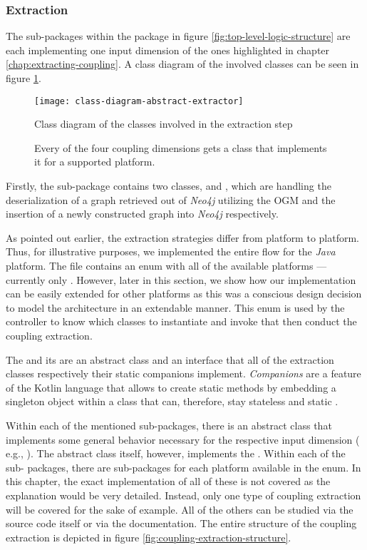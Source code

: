 \documentclass[12pt,a4paper]{report}
\begin{document}
\subsubsection{Extraction}
The sub-packages within the package 
in figure \ref{fig:top-level-logic-structure} are each
implementing one input dimension of the ones highlighted in chapter
\ref{chap:extracting-coupling}.
A class diagram of the involved classes can be seen in
figure \ref{fig:class-diagram-abstract-extractor}.

\begin{figure}[htbp]
\centering
\texttt{[image: class-diagram-abstract-extractor]}
\caption{Class diagram of the classes involved in the extraction step}
\caption*{\centering
  Every of the four coupling dimensions gets a class that implements it
  for a supported platform.
}
\label{fig:class-diagram-abstract-extractor}
\end{figure}

Firstly, the sub-package  contains two classes,  and , which are handling the
deserialization of a graph retrieved out of \textit{Neo4j} utilizing the OGM
and the insertion of a newly constructed graph into \textit{Neo4j}
respectively.

As pointed out earlier, the extraction strategies differ from platform to
platform. Thus, for illustrative purposes, we implemented the entire flow for
the \textit{Java} platform. The  file contains an enum with
all of the available platforms --- currently only . However, later
in this section, we show how our implementation can be easily extended for
other platforms as this was a conscious design decision to model the
architecture in an extendable manner. This enum is used by the controller to
know which classes to instantiate and invoke that then conduct the coupling
extraction.

The  and its  are an
abstract class and an interface that all of the extraction classes respectively
their static companions implement. \textit{Companions} are a feature of the
Kotlin language that allows to create static methods by embedding a singleton
object within a class that can, therefore, stay stateless and static
\cite{kotlin-companions}.

Within each of the mentioned sub-packages, there is an abstract class that
implements some general behavior necessary for the respective input dimension (
e.g., ). The abstract class itself,
however, implements the . Within each of the sub-
packages, there are sub-packages for each platform available in the  enum. In this chapter, the exact implementation of all of these is
not covered as the explanation would be very detailed. Instead, only one type
of coupling extraction will be covered for the sake of example. All of the
others can be studied via the source code itself or via the documentation.
The entire structure of the coupling extraction is depicted in figure
\ref{fig:coupling-extraction-structure}.
\end{document}
